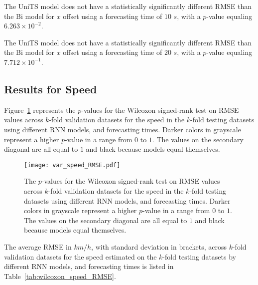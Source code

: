 The UniTS model does not have a statistically significantly different RMSE than the Bi model for $x$ offset using a forecasting time of $10$ $s$, with a $p$-value equaling $6.263 \times 10^{-2}$.

The UniTS model does not have a statistically significantly different RMSE than the Bi model for $x$ offset using a forecasting time of $20$ $s$, with a $p$-value equaling $7.712 \times 10^{-1}$.

\subsection{Results for Speed}

Figure~\ref{fig:var_speed_RMSE} represents the $p$-values for the Wilcoxon signed-rank test on RMSE values across $k$-fold validation datasets for the speed in the $k$-fold testing datasets using different RNN models, and forecasting times. Darker colors in grayscale represent a higher $p$-value in a range from $0$ to $1$. The values on the secondary diagonal are all equal to $1$ and black because models equal themselves.

\begin{figure}[!ht]
	\centering
	\texttt{[image: var\_speed\_RMSE.pdf]}
	\caption{The $p$-values for the Wilcoxon signed-rank test on RMSE values across $k$-fold validation datasets for the speed in the $k$-fold testing datasets using different RNN models, and forecasting times. Darker colors in grayscale represent a higher $p$-value in a range from $0$ to $1$. The values on the secondary diagonal are all equal to $1$ and black because models equal themselves.}
	\label{fig:var_speed_RMSE}
\end{figure}

The average RMSE in $km/h$, with standard deviation in brackets, across $k$-fold validation datasets for the speed estimated on the $k$-fold testing datasets by different RNN models, and forecasting times is listed in Table~\ref{tab:wilcoxon_speed_RMSE}.

